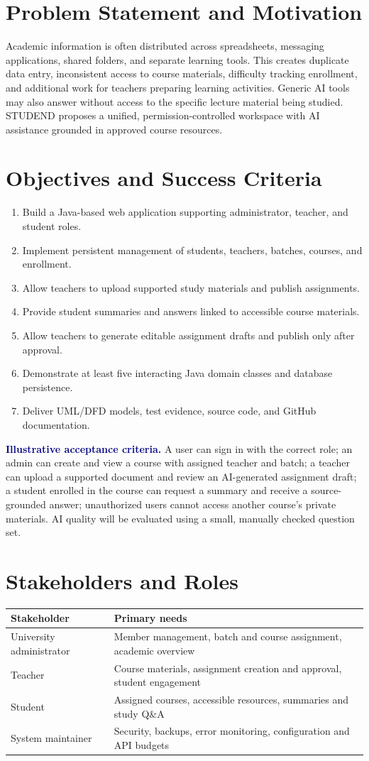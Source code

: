\documentclass[11pt,a4paper]{article}
\newcommand{\heading}[1]{\vspace{5pt}\textcolor{navy}{\textbf{#1}}}
\begin{document}
\section{Problem Statement and Motivation}
Academic information is often distributed across spreadsheets, messaging applications, shared folders, and separate learning tools. This creates duplicate data entry, inconsistent access to course materials, difficulty tracking enrollment, and additional work for teachers preparing learning activities. Generic AI tools may also answer without access to the specific lecture material being studied. STUDEND proposes a unified, permission-controlled workspace with AI assistance grounded in approved course resources.
\section{Objectives and Success Criteria}
\begin{enumerate}[leftmargin=*]
\item Build a Java-based web application supporting administrator, teacher, and student roles.
\item Implement persistent management of students, teachers, batches, courses, and enrollment.
\item Allow teachers to upload supported study materials and publish assignments.
\item Provide student summaries and answers linked to accessible course materials.
\item Allow teachers to generate editable assignment drafts and publish only after approval.
\item Demonstrate at least five interacting Java domain classes and database persistence.
\item Deliver UML/DFD models, test evidence, source code, and GitHub documentation.
\end{enumerate}
\heading{Illustrative acceptance criteria.} A user can sign in with the correct role; an admin can create and view a course with assigned teacher and batch; a teacher can upload a supported document and review an AI-generated assignment draft; a student enrolled in the course can request a summary and receive a source-grounded answer; unauthorized users cannot access another course's private materials. AI quality will be evaluated using a small, manually checked question set.
\section{Stakeholders and Roles}
\begin{tabular}{p{}p{}}\toprule Stakeholder&Primary needs\\\midrule University administrator&Member management, batch and course assignment, academic overview\\Teacher&Course materials, assignment creation and approval, student engagement\\Student&Assigned courses, accessible resources, summaries and study Q\&A\\System maintainer&Security, backups, error monitoring, configuration and API budgets\\\bottomrule\end{tabular}
\end{document}
